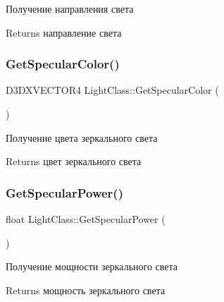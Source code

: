 Получение направления света 

\begin{DoxyReturn}{Returns}
направление света 
\end{DoxyReturn}
\mbox{\label{class_light_class_ab5f7e02afb18d90656337397dfc234a4}} 
\subsubsection{\texorpdfstring{Get\+Specular\+Color()}{GetSpecularColor()}}
{\footnotesize\ttfamily D3\+D\+X\+V\+E\+C\+T\+O\+R4 Light\+Class\+::\+Get\+Specular\+Color (\begin{DoxyParamCaption}{ }\end{DoxyParamCaption})}



Получение цвета зеркального света 

\begin{DoxyReturn}{Returns}
цвет зеркального света 
\end{DoxyReturn}
\mbox{\label{class_light_class_ad84d8444a33be065ec7ef8a83d0de992}} 
\subsubsection{\texorpdfstring{Get\+Specular\+Power()}{GetSpecularPower()}}
{\footnotesize\ttfamily float Light\+Class\+::\+Get\+Specular\+Power (\begin{DoxyParamCaption}{ }\end{DoxyParamCaption})}



Получение мощности зеркального света 

\begin{DoxyReturn}{Returns}
мощность зеркального света 
\end{DoxyReturn}
\mbox{\label{class_light_class_af5ca906d1c54205419a49ba2463b4153}} 
